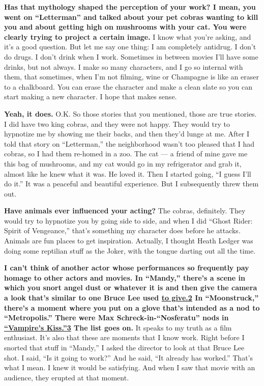 \textbf{Has that mythology shaped the perception of your work? I mean,
you went on ``Letterman'' and talked about your pet cobras wanting to
kill you and about getting high on mushrooms with your cat. You were
clearly trying to project a certain image.} I know what you're asking,
and it's a good question. But let me say one thing: I am completely
antidrug. I don't do drugs. I don't drink when I work. Sometimes in
between movies I'll have some drinks, but not always. I make so many
characters, and I go so internal with them, that sometimes, when I'm not
filming, wine or Champagne is like an eraser to a chalkboard. You can
erase the character and make a clean slate so you can start making a new
character. I hope that makes sense.

\textbf{Yeah, it does.} O.K. So those stories that you mentioned, those
are true stories. I did have two king cobras, and they were not happy.
They would try to hypnotize me by showing me their backs, and then
they'd lunge at me. After I told that story on ``Letterman,'' the
neighborhood wasn't too pleased that I had cobras, so I had them
re-homed in a zoo. The cat --- a friend of mine gave me this bag of
mushrooms, and my cat would go in my refrigerator and grab it, almost
like he knew what it was. He loved it. Then I started going, ``I guess
I'll do it.'' It was a peaceful and beautiful experience. But I
subsequently threw them out.

\textbf{Have animals ever influenced your acting?} The cobras,
definitely. They would try to hypnotize you by going side to side, and
when I did ``Ghost Rider: Spirit of Vengeance,'' that's something my
character does before he attacks. Animals are fun places to get
inspiration. Actually, I thought Heath Ledger was doing some reptilian
stuff as the Joker, with the tongue darting out all the time.

\textbf{I can't think of another actor whose performances so frequently
pay homage to other actors and movies. In ``Mandy,'' there's a scene in
which you snort angel dust or whatever it is and then give the camera a
look that's similar to one Bruce Lee used
\href{http://nytimes3xbfgragh.onion\#tooltip-2}{to give.2} In
``Moonstruck,'' there's a moment where you put on a glove that's
intended as a nod to ``Metropolis.'' There were Max
Schreck-in-``Nosferatu'' nods in
\href{http://nytimes3xbfgragh.onion\#tooltip-3}{``Vampire's
Kiss.''}\href{http://nytimes3xbfgragh.onion\#tooltip-3}{3} The list goes
on.} It speaks to my truth as a film enthusiast. It's also that these
are moments that I know work. Right before I snorted that stuff in
``Mandy,'' I asked the director to look at that Bruce Lee shot. I said,
``Is it going to work?'' And he said, ``It already has worked.'' That's
what I mean. I knew it would be satisfying. And when I saw that movie
with an audience, they erupted at that moment.

